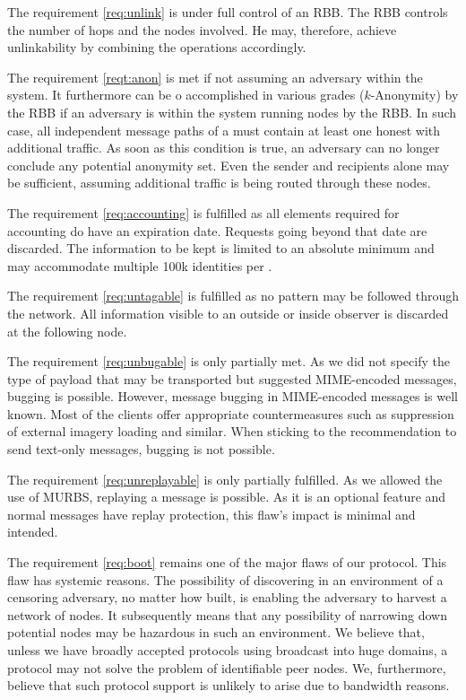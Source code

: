 The requirement \ref{req:unlink} is under full control of an RBB. The RBB controls the number of hops and the nodes involved. He may, therefore, achieve unlinkability by combining the operations accordingly.

The requirement \ref{reqt:anon} is met if not assuming an adversary within the system. It furthermore can be o accomplished in various grades ($k$-Anonymity) by the RBB if an adversary is within the system running nodes by the RBB. In such case, all independent message paths of a \VortexMessage{} must contain at least one honest \VortexNode{} with additional traffic. As soon as this condition is true, an adversary can no longer conclude any potential anonymity set. Even the sender and recipients alone may be sufficient, assuming additional traffic is being routed through these nodes.

The requirement \ref{req:accounting} is fulfilled as all elements required for accounting do have an expiration date. Requests going beyond that date are discarded. The information to be kept is limited to an absolute minimum and may accommodate multiple 100k identities per \VortexNode.

The requirement \ref{req:untagable} is fulfilled as no pattern may be followed through the network. All information visible to an outside or inside observer is discarded at the following node.

The requirement \ref{req:unbugable} is only partially met. As we did not specify the type of payload that may be transported but suggested MIME-encoded messages, bugging is possible. However, message bugging in MIME-encoded messages is well known. Most of the clients offer appropriate countermeasures such as suppression of external imagery loading and similar. When sticking to the recommendation to send text-only messages, bugging is not possible.

The requirement \ref{req:unreplayable} is only partially fulfilled. As we allowed the use of MURBS, replaying a message is possible. As it is an optional feature and normal messages have replay protection, this flaw's impact is minimal and intended.

The requirement \ref{req:boot} remains one of the major flaws of our protocol. This flaw has systemic reasons. The possibility of discovering \VortexNodes{} in an environment of a censoring adversary, no matter how built, is enabling the adversary to harvest a network of nodes. It subsequently means that any possibility of narrowing down potential nodes may be hazardous in such an environment. We believe that, unless we have broadly accepted protocols using broadcast into huge domains, a protocol may not solve the problem of identifiable peer nodes. We, furthermore, believe that such protocol support is unlikely to arise due to bandwidth reasons. 

